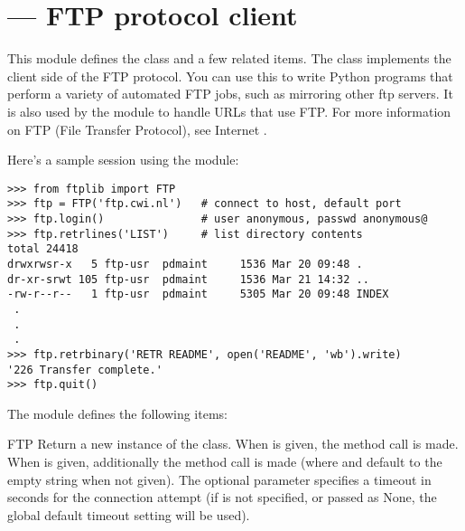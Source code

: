 \section{ ---
         FTP protocol client}



This module defines the class  and a few related items.
The  class implements the client side of the FTP
protocol.  You can use this to write Python
programs that perform a variety of automated FTP jobs, such as
mirroring other ftp servers.  It is also used by the module
 to handle URLs that use FTP.  For more information
on FTP (File Transfer Protocol), see Internet .

Here's a sample session using the  module:

\begin{verbatim}
>>> from ftplib import FTP
>>> ftp = FTP('ftp.cwi.nl')   # connect to host, default port
>>> ftp.login()               # user anonymous, passwd anonymous@
>>> ftp.retrlines('LIST')     # list directory contents
total 24418
drwxrwsr-x   5 ftp-usr  pdmaint     1536 Mar 20 09:48 .
dr-xr-srwt 105 ftp-usr  pdmaint     1536 Mar 21 14:32 ..
-rw-r--r--   1 ftp-usr  pdmaint     5305 Mar 20 09:48 INDEX
 .
 .
 .
>>> ftp.retrbinary('RETR README', open('README', 'wb').write)
'226 Transfer complete.'
>>> ftp.quit()
\end{verbatim}

The module defines the following items:

\begin{classdesc}{FTP}{}
Return a new instance of the  class.  When
 is given, the method call  is
made.  When  is given, additionally the method call
 is made (where
 and  default to the empty string when not given).
The optional  parameter specifies a timeout in seconds for the
connection attempt (if is not specified, or passed as None, the global
default timeout setting will be used).
\end{classdesc}

